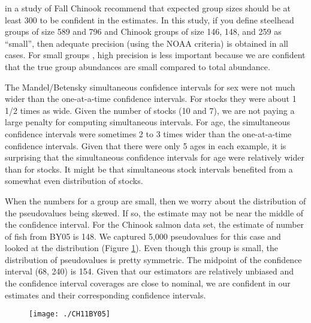 \documentclass[11pt]{article}
\begin{document}
 in a study of Fall Chinook recommend that expected group sizes should be at least 300 to be confident in the estimates. In this study, if you define steelhead groups of size 589 and 796 and Chinook groups of size 146, 148, and 259 as ``small'', then adequate precision (using the NOAA criteria) is obtained in all cases. For small groups	, high precision is less important because we are confident that the true group abundances are small compared to total abundance.

The Mandel/Betensky simultaneous confidence intervals for sex were not much wider than the one-at-a-time confidence intervals.  For stocks they were about 1 1/2 times as wide.  Given the number of stocks (10 and 7), we are not paying a large penalty for computing simultaneous intervals.  For age, the simultaneous confidence intervals were sometimes 2 to 3 times wider than the one-at-a-time confidence intervals.  Given that there were only 5 ages in each example, it is surprising that the simultaneous confidence intervals for age were relatively wider than for stocks. It might be that simultaneous stock intervals benefited from a somewhat even distribution of stocks.

When the numbers for a group are small, then we worry about the distribution of the pseudovalues being skewed. If so, the estimate may not be near the middle of the confidence interval. For the Chinook salmon data set, the estimate of number of fish from BY05 is 148. We captured 5,000 pseudovalues for this case  and looked at the distribution (Figure \ref{fig:CH11BY05}). Even though this group is small, the distribution of pseudovalues is pretty symmetric. The midpoint of the confidence interval (68, 240) is 154. Given that our estimators are relatively unbiased and the confidence interval coverages are close to nominal, we are confident in our estimates and their corresponding confidence intervals.

\begin{figure}[htbp]
\centering
\texttt{[image: ./CH11BY05]}
\caption{}
\label{fig:CH11BY05}
\end{figure}
\end{document}
